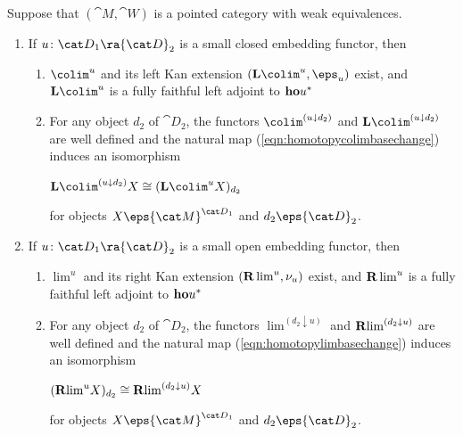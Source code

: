 \begin{thm}
\label{thm:openembeddingdiagrams}
Suppose that $({\cat M}, {\cat W})$ is a pointed category with weak equivalences.
\begin{enumerate}
\item
If $u \colon {\cat D}_1 \ra {\cat D}_2$ is a small closed embedding functor, then
\begin{enumerate}
\item
$\colim^u$ and its left Kan extension $({\bf L}\colim^u, \eps_u)$ exist, and ${\bf L}\colim^u$ is a fully faithful left adjoint to ${\bf ho}u^*$
\item
For any object $d_2$ of ${\cat D}_2$, the functors ${\colim}^{(u \downarrow d_2)}$ and ${\bf L}{\colim}^{(u \downarrow d_2)}$ are well defined and the natural map (\ref{eqn:homotopycolimbasechange}) induces an isomorphism
\begin{center}
${\bf L}{\colim}^{(u \downarrow d_2)} X \cong ({\bf L}{\colim}^u X)_{d_2}$
\end{center}
for objects $X \eps {\cat M}^{{\cat D}_1}$ and $d_2 \eps {\cat D}_2$.
\end{enumerate}
\item
If $u \colon {\cat D}_1 \ra {\cat D}_2$ is a small open embedding functor, then
\begin{enumerate}
\item
$\lim^u$ and its right Kan extension $({\bf R}\lim^u, \nu_u)$ exist, and ${\bf R}\lim^u$ is a fully faithful left adjoint to ${\bf ho}u^*$
\item
For any object $d_2$ of ${\cat D}_2$, the functors ${\lim}^{(d_2 \downarrow u)}$ and ${\bf R}{\lim}^{(d_2 \downarrow u)}$ are well defined and the natural map (\ref{eqn:homotopylimbasechange}) induces an isomorphism
\begin{center}
$({\bf R}{\lim}^u X)_{d_2} \cong {\bf R}{\lim}^{(d_2 \downarrow u)} X$
\end{center}
for objects $X \eps {\cat M}^{{\cat D}_1}$ and $d_2 \eps {\cat D}_2$.
\end{enumerate}
\end{enumerate}
\end{thm}

